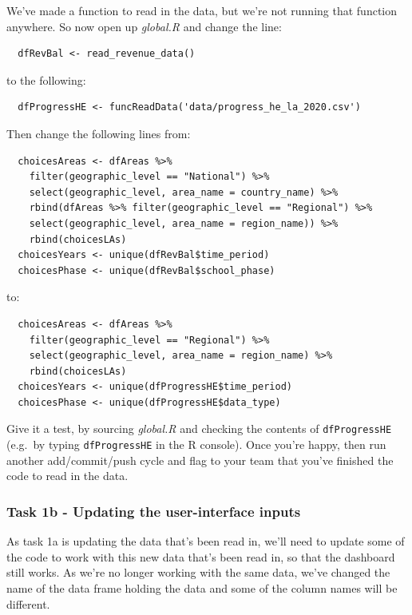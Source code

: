 \documentclass[
  12pt,
]{article}
\begin{document}
We've made a function to read in the data, but we're not running that
function anywhere. So now open up \emph{global.R} and change the line:

\begin{verbatim}
  dfRevBal <- read_revenue_data()
\end{verbatim}

to the following:

\begin{verbatim}
  dfProgressHE <- funcReadData('data/progress_he_la_2020.csv')
\end{verbatim}

Then change the following lines from:

\begin{verbatim}
  choicesAreas <- dfAreas %>%
    filter(geographic_level == "National") %>%
    select(geographic_level, area_name = country_name) %>%
    rbind(dfAreas %>% filter(geographic_level == "Regional") %>% 
    select(geographic_level, area_name = region_name)) %>%
    rbind(choicesLAs)
  choicesYears <- unique(dfRevBal$time_period)
  choicesPhase <- unique(dfRevBal$school_phase)
\end{verbatim}

to:

\begin{verbatim}
  choicesAreas <- dfAreas %>%
    filter(geographic_level == "Regional") %>% 
    select(geographic_level, area_name = region_name) %>%
    rbind(choicesLAs)
  choicesYears <- unique(dfProgressHE$time_period)
  choicesPhase <- unique(dfProgressHE$data_type)
\end{verbatim}

Give it a test, by sourcing \emph{global.R} and checking the contents of
\texttt{dfProgressHE} (e.g.~by typing \texttt{dfProgressHE} in the R
console). Once you're happy, then run another add/commit/push cycle and
flag to your team that you've finished the code to read in the data.

\hypertarget{task-1b---updating-the-user-interface-inputs}{%
\subsubsection{Task 1b - Updating the user-interface
inputs}\label{task-1b---updating-the-user-interface-inputs}}

As task 1a is updating the data that's been read in, we'll need to
update some of the code to work with this new data that's been read in,
so that the dashboard still works. As we're no longer working with the
same data, we've changed the name of the data frame holding the data and
some of the column names will be different.
\end{document}
